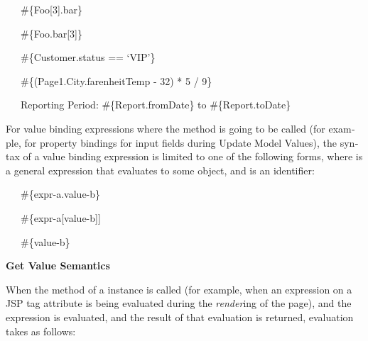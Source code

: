 \foreignlanguage{english}{\ \ \ \#\{Foo[3].bar\}}

\foreignlanguage{english}{\ \ \ \#\{Foo.bar[3]\}}

\foreignlanguage{english}{\ \ \ \#\{Customer.status ==
{\textquoteleft}VIP{\textquoteright}\}}

\foreignlanguage{english}{\ \ \ \#\{(Page1.City.farenheitTemp - 32) * 5
/ 9\}}

\foreignlanguage{english}{\ \ \ Reporting Period: \#\{Report.fromDate\}
to \#\{Report.toDate\}}

\foreignlanguage{english}{For value binding expressions where the
}\foreignlanguage{english}{
method is going to be called (for example, for
}\foreignlanguage{english}{
property bindings for input fields during Update Model Values), the
syntax of a value binding expression is limited to one of the following
forms, where
}\foreignlanguage{english}{
is a general expression that evaluates to some object, and
}\foreignlanguage{english}{
is an identifier:}

\foreignlanguage{english}{\ \ \ \#\{expr-a.value-b\}}

\foreignlanguage{english}{\ \ \ \#\{expr-a[value-b]]}

\foreignlanguage{english}{\ \ \ \#\{value-b\}}

{\bfseries
\foreignlanguage{english}{Get Value Semantics}}

\foreignlanguage{english}{When the
}\foreignlanguage{english}{
method of a
}\foreignlanguage{english}{
instance is called (for example, when an expression on a JSP tag
attribute is being evaluated during the
}\foreignlanguage{english}{\textit{render}}\foreignlanguage{english}{ing
of the page), and the expression is evaluated, and the result of that
evaluation is returned, evaluation takes as follows:}

